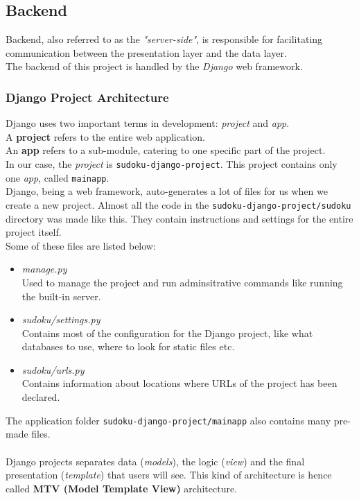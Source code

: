\documentclass[12pt, a4paper]{report}
\begin{document}
    \subsection{Backend}
    Backend, also referred to as the \emph{"server-side"}, is responsible for facilitating communication between the presentation layer and the data layer.\\
    The backend of this project is handled by the \emph{Django} web framework.\\
    \subsubsection{Django Project Architecture}
    Django uses two important terms in development: \emph{project} and \emph{app}.\\
    A \textbf{project} refers to the entire web application.\\
    An \textbf{app} refers to a sub-module, catering to one specific part of the project.\\
    In our case, the \emph{project} is \texttt{sudoku-django-project}. This project contains only one \emph{app}, called \texttt{mainapp}.\\
    Django, being a web framework, auto-generates a lot of files for us when we create a new project. Almost all the code in the \texttt{sudoku-django-project/sudoku} directory was made like this. They contain instructions and settings for the entire project itself.\\
    Some of these files are listed below:
    \begin{itemize}
        \item \textit{manage.py}\\
        Used to manage the project and run adminsitrative commands like running the built-in server.
        \item \textit{sudoku/settings.py}\\
        Contains most of the configuration for the Django project, like what databases to use, where to look for static files etc.
        \item \textit{sudoku/urls.py}\\
        Contains information about locations where URLs of the project has been declared.
    \end{itemize}
    The application folder \texttt{sudoku-django-project/mainapp} also contains many pre-made files.\\
    \\
    Django projects separates data (\emph{models}), the logic (\emph{view}) and the final presentation (\emph{template}) that users will see. This kind of architecture is hence called \textbf{MTV (Model Template View)} architecture.\\
\end{document}
